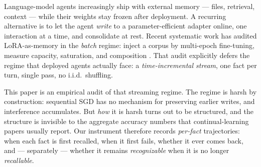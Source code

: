 \documentclass[11pt]{article}
\begin{document}
Language-model agents increasingly ship with external memory --- files, retrieval, context --- while their
weights stay frozen after deployment. A recurring alternative is to let the agent \emph{write} to a
parameter-efficient adapter online, one interaction at a time, and consolidate at rest. Recent
systematic work has audited LoRA-as-memory in the \emph{batch} regime: inject a corpus by multi-epoch
fine-tuning, measure capacity, saturation, and composition \citep{back2026lora}. That audit explicitly
defers the regime that deployed agents actually face: a \emph{time-incremental stream}, one fact per
turn, single pass, no i.i.d.\ shuffling.

This paper is an empirical audit of that streaming regime. The regime is harsh by construction:
sequential SGD has no mechanism for preserving earlier writes, and interference accumulates. But
\emph{how} it is harsh turns out to be structured, and the structure is invisible to the aggregate
accuracy numbers that continual-learning papers usually report. Our instrument therefore records
\emph{per-fact} trajectories: when each fact is first recalled, when it first fails, whether it ever
comes back, and --- separately --- whether it remains \emph{recognizable} when it is no longer
\emph{recallable}.
\end{document}
